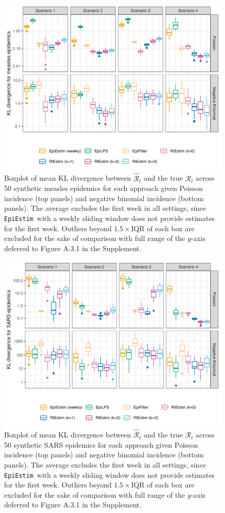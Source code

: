 \documentclass[10pt,letterpaper]{article}
\def\EpiEstim{\texttt{EpiEstim}}
\def\calR{\mathcal{R}}
\renewcommand{\hat}{\widehat}
\begin{document}
\begin{figure}[!t]
  \centering
  \includegraphics[width=.9\linewidth]{fig/fig_kl_week_measles.png}
  \caption{Boxplot of mean KL divergence between $\hat{\calR}_t$ and the true
  $\calR_t$ across 50 synthetic measles epidemics for each approach given
  Poisson incidence (top panels) and negative binomial incidence (bottom
  panels). The average excludes the first week in all settings, since
  \EpiEstim\ with a weekly sliding window does not provide estimates for the
  first week. Outliers beyond $1.5\times$IQR of each box are excluded for the
  sake of comparison with full range of the $y$-axis deferred to Figure A.3.1 in
  the Supplement.} 
  \label{fig:kl-res-measles}
\end{figure}

\begin{figure}[!t]
  \centering
  \includegraphics[width=.9\linewidth]{fig/fig_kl_week_sars.png}
  \caption{Boxplot of mean KL divergence between $\hat{\calR}_t$ and the true
  $\calR_t$ across 50 synthetic SARS epidemics for each approach given Poisson
  incidence (top panels) and negative binomial incidence (bottom panels). The
  average excludes the first week in all settings, since \EpiEstim\ with a
  weekly sliding window does not provide estimates for the first week. Outliers
  beyond $1.5\times$IQR of each box are excluded for the sake of comparison with
  full range of the $y$-axis deferred to Figure A.3.1 in the Supplement.} 
  \label{fig:kl-res-sars}
\end{figure}
\end{document}
